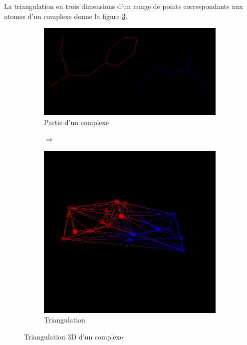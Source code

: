 La triangulation en trois dimensions d'un nuage de points correspondants aux atomes
d'un complexe donne la figure \ref{fig::delaunays_3d}.

\begin{figure}[ht]
\centering
\begin{subfigure}{0.45\textwidth}
  \centering
  \includegraphics[width=\textwidth]{figures/small_prot.png}
  \caption{Partie d'un complexe}
  \label{fig::small_prot}
\end{subfigure}%
\begin{subfigure}{0.1\textwidth}
  \centering
  $\Longrightarrow$
\end{subfigure}%
\begin{subfigure}{0.45\textwidth}
  \centering
  \includegraphics[width=\textwidth]{figures/3d_triangulation04.png}
  \caption{Triangulation}
  \label{fig::prot_delaunay}
\end{subfigure}
\caption{Triangulation 3D d'un complexe}
\label{fig::delaunays_3d}
\end{figure}

